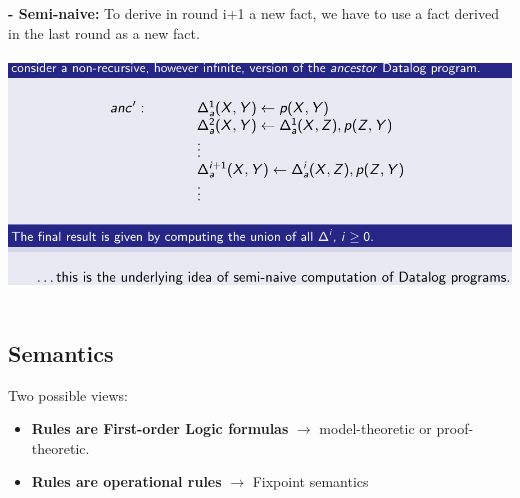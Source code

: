 \documentclass{article}
\begin{document}
\textbf{- Semi-naive: }To derive in round i+1 a new fact, we have to use a fact derived in the last round as a new fact.\\\\
\includegraphics[scale=0.3]{82.png}\\\\

\subsection{Semantics}
Two possible views:
\begin{itemize}
\item \textbf{Rules are First-order Logic formulas} $\rightarrow$ model-theoretic or proof-theoretic.
\item \textbf{Rules are operational rules} $\rightarrow$ Fixpoint semantics
\end{itemize}
\end{document}

